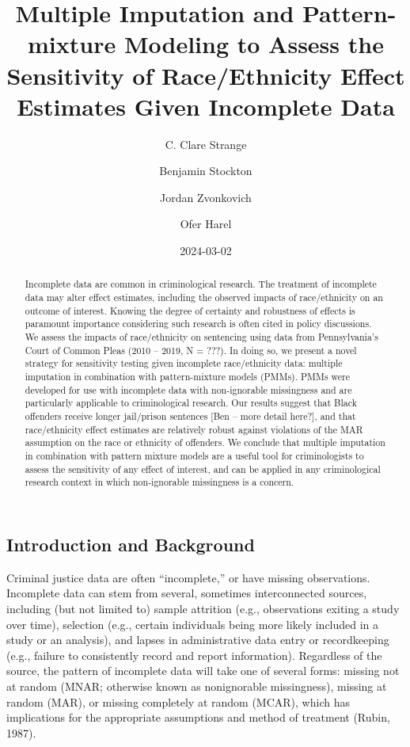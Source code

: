 \documentclass[
  letterpaper,
  DIV=11,
  numbers=noendperiod]{scrartcl}
\title{Multiple Imputation and Pattern-mixture Modeling to Assess the
Sensitivity of Race/Ethnicity Effect Estimates Given Incomplete Data}
\author{C. Clare Strange \and Benjamin Stockton \and Jordan
Zvonkovich \and Ofer Harel}
\date{2024-03-02}
\begin{document}
\maketitle
\begin{abstract}
Incomplete data are common in criminological research. The treatment of
incomplete data may alter effect estimates, including the observed
impacts of race/ethnicity on an outcome of interest. Knowing the degree
of certainty and robustness of effects is paramount importance
considering such research is often cited in policy discussions. We
assess the impacts of race/ethnicity on sentencing using data from
Pennsylvania's Court of Common Pleas (2010 -- 2019, N = ???). In doing
so, we present a novel strategy for sensitivity testing given incomplete
race/ethnicity data: multiple imputation in combination with
pattern-mixture models (PMMs). PMMs were developed for use with
incomplete data with non-ignorable missingness and are particularly
applicable to criminological research. Our results suggest that Black
offenders receive longer jail/prison sentences {[}Ben -- more detail
here?{]}, and that race/ethnicity effect estimates are relatively robust
against violations of the MAR assumption on the race or ethnicity of
offenders. We conclude that multiple imputation in combination with
pattern mixture models are a useful tool for criminologists to assess
the sensitivity of any effect of interest, and can be applied in any
criminological research context in which non-ignorable missingness is a
concern.
\end{abstract}
\ifdefined\Shaded\renewenvironment{Shaded}{\begin{tcolorbox}[interior hidden, breakable, frame hidden, borderline west={3pt}{0pt}{shadecolor}, enhanced, boxrule=0pt, sharp corners]}{\end{tcolorbox}}\fi

\hypertarget{introduction-and-background}{%
\subsection{Introduction and
Background}\label{introduction-and-background}}

Criminal justice data are often ``incomplete,'' or have missing
observations. Incomplete data can stem from several, sometimes
interconnected sources, including (but not limited to) sample attrition
(e.g., observations exiting a study over time), selection (e.g., certain
individuals being more likely included in a study or an analysis), and
lapses in administrative data entry or recordkeeping (e.g., failure to
consistently record and report information). Regardless of the source,
the pattern of incomplete data will take one of several forms: missing
not at random (MNAR; otherwise known as nonignorable missingness),
missing at random (MAR), or missing completely at random (MCAR), which
has implications for the appropriate assumptions and method of treatment
(Rubin, 1987).
\end{document}
